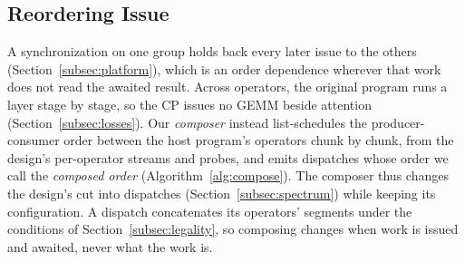 \subsection{Reordering Issue}
\label{subsec:order}



\label{subsec:compose}
A synchronization on one group holds back every later issue to the others (Section~\ref{subsec:platform}), which is an order dependence wherever that work does not read the awaited result.
Across operators, the original program runs a layer stage by stage, so the CP issues no GEMM beside attention (Section~\ref{subsec:losses}).
Our \emph{composer} instead list-schedules the producer-consumer order between the host program's operators chunk by chunk, from the design's per-operator streams and probes, and emits dispatches whose order we call the \emph{composed order} (Algorithm~\ref{alg:compose}).
The composer thus changes the design's cut into dispatches (Section~\ref{subsec:spectrum}) while keeping its configuration.
A dispatch concatenates its operators' segments under the conditions of Section~\ref{subsec:legality}, so composing changes when work is issued and awaited, never what the work is.

